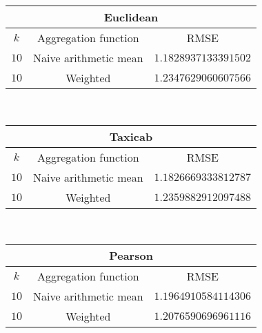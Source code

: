 \documentclass[final]{cvpr}
\begin{document}

\begin{tabular}{| c | c | c |}
    \hline
    \multicolumn{3}{|c|}{\textbf{Euclidean}}\\
    \hline
    $k$ & Aggregation function & RMSE\\
    \hline
    $10$ & Naive arithmetic mean & $1.1828937133391502$\\
    \hline
    $10$ & Weighted & $1.2347629060607566$\\
    \hline
\end{tabular}\\

\hspace{2em}

\begin{tabular}{| c | c | c |}
    \hline
    \multicolumn{3}{|c|}{\textbf{Taxicab}}\\
    \hline
    $k$ & Aggregation function & RMSE\\
    \hline
    $10$ & Naive arithmetic mean & $1.1826669333812787$\\
    \hline
    $10$ & Weighted & $1.2359882912097488$\\
    \hline
\end{tabular}\\

\hspace{2em}

\begin{tabular}{| c | c | c |}
    \hline
    \multicolumn{3}{|c|}{\textbf{Pearson}}\\
    \hline
    $k$ & Aggregation function & RMSE\\
    \hline
    $10$ & Naive arithmetic mean & $1.1964910584114306$\\
    \hline
    $10$ & Weighted & $1.2076590696961116$\\
    \hline
\end{tabular}\\
\end{document}
